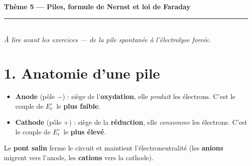 \documentclass[11pt,a4paper]{article}
\newcommand{\Ered}{\ensuremath{E_{\mathrm{r}}^{\circ}}}
\begin{document}
\begin{center}
{\LARGE\bfseries\color{primarydark}Thème 5 — Piles, formule de Nernst et loi de Faraday}\\[3pt]
{\color{primary}\rule{10.5cm}{1.2pt}}\\[4pt]
{\small\itshape À lire avant les exercices — de la pile spontanée à l'électrolyse forcée.}
\end{center}

\vspace{-2pt}
\section*{1. Anatomie d'une pile}
\begin{defi}
\begin{itemize}[leftmargin=1.5em,topsep=1pt,itemsep=1pt]
  \item \textbf{Anode} (pôle $\boldsymbol{-}$) : siège de l'\textbf{oxydation}, elle \emph{produit} les
        électrons. C'est le couple de \Ered\ le \textbf{plus faible}.
  \item \textbf{Cathode} (pôle $\boldsymbol{+}$) : siège de la \textbf{réduction}, elle \emph{consomme}
        les électrons. C'est le couple de \Ered\ le \textbf{plus élevé}.
\end{itemize}
Le \textbf{pont salin} ferme le circuit et maintient l'électroneutralité (les \textbf{anions} migrent
vers l'anode, les \textbf{cations} vers la cathode).
\end{defi}
\end{document}
